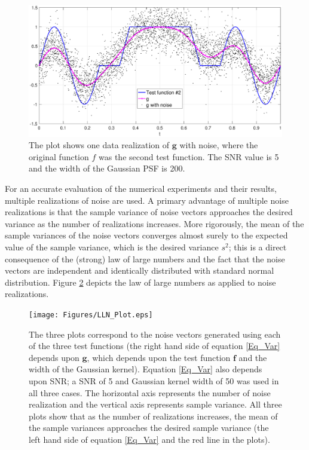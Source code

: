 \documentclass[12pt]{article}
\newcommand{\gdis}{\mathbf{g}}
\newcommand{\fdis}{\mathbf{f}}
\newcommand{\SD}{s}	%
\begin{document}
\begin{figure}
	\centerline{\includegraphics[scale = 0.45]{Figures/NoisePlot1D_F2_S05_W200.eps}}
\caption{The plot shows one data realization of $\gdis$ with noise, where the original function $f$ was the second test function. The SNR value is 5 and the width of the Gaussian PSF is 200.}
\label{NoisePlot1D_F2_S05_W200}
\end{figure}

For an accurate evaluation of the numerical experiments and their results, multiple realizations of noise are used. A primary advantage of multiple noise realizations is that the sample variance of noise vectors approaches the desired variance as the number of realizations increases. More rigorously, the mean of the sample variances of the noise vectors converges almost surely to the expected value of the sample variance, which is the desired variance $\SD^2$; this is a direct consequence of the (strong) law of large numbers and the fact that the noise vectors are independent and identically distributed with standard normal distribution. Figure \ref{LLN_Plot} depicts the law of large numbers as applied to noise realizations.  \par

\begin{figure}
\centerline{\texttt{[image: Figures/LLN\_Plot.eps]}}
\caption{The three plots correspond to the noise vectors generated using each of the three test functions (the right hand side of equation \eqref{Eq_Var} depends upon $\gdis$, which depends upon the test function $\fdis$ and the width of the Gaussian kernel). Equation \eqref{Eq_Var} also depends upon SNR; a SNR of 5 and Gaussian kernel width of 50 was used in all three cases. The horizontal axis represents the number of noise realization and the vertical axis represents sample variance. All three plots show that as the number of realizations increases, the mean of the sample variances approaches the desired sample variance (the left hand side of equation \eqref{Eq_Var} and the red line in the plots).}
\label{LLN_Plot}
\end{figure}
\end{document}
